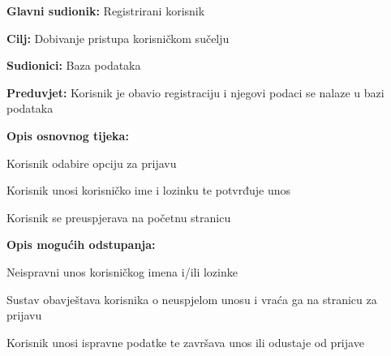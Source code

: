 \noindent {}
\begin{packed_item}

	\item \textbf{Glavni sudionik: }Registrirani korisnik
	\item  \textbf{Cilj:} Dobivanje pristupa korisničkom sučelju
	\item  \textbf{Sudionici:} Baza podataka
	\item  \textbf{Preduvjet:} Korisnik je obavio registraciju i njegovi podaci se nalaze u bazi podataka
	\item  \textbf{Opis osnovnog tijeka:}

	\item[] \begin{packed_enum}

		\item Korisnik odabire opciju za prijavu
		\item Korisnik unosi korisničko ime i lozinku te potvrđuje unos
		\item Korisnik se preuspjerava na početnu stranicu
	\end{packed_enum}

	\item  \textbf{Opis mogućih odstupanja:}

	\item[] \begin{packed_item}

		\item[2.a] Neispravni unos korisničkog imena i/ili lozinke
		\item[] \begin{packed_enum}

			\item Sustav obavještava korisnika o neuspjelom unosu i vraća ga na stranicu za prijavu
			\item Korisnik unosi ispravne podatke te završava unos ili odustaje od prijave

		\end{packed_enum}
	\end{packed_item}
\end{packed_item}

